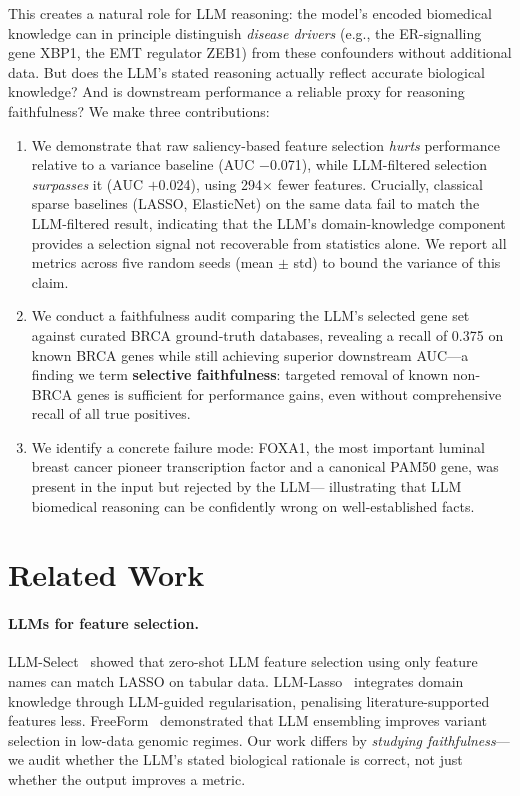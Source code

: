 \documentclass{article}
\begin{document}
This creates a natural role for LLM reasoning: the model's encoded
biomedical knowledge can in principle distinguish \emph{disease drivers}
(e.g., the ER-signalling gene XBP1, the EMT regulator ZEB1) from these
confounders without additional data.
But does the LLM's stated reasoning actually reflect accurate biological
knowledge?
And is downstream performance a reliable proxy for reasoning faithfulness?
We make three contributions:
\begin{enumerate}
  \item We demonstrate that raw saliency-based feature selection
        \emph{hurts} performance relative to a variance baseline
        (AUC $-$0.071), while LLM-filtered selection \emph{surpasses} it
        (AUC $+$0.024), using 294$\times$ fewer features.
        Crucially, classical sparse baselines (LASSO, ElasticNet) on the
        same data fail to match the LLM-filtered result, indicating that
        the LLM's domain-knowledge component provides a selection signal
        not recoverable from statistics alone.
        We report all metrics across five random seeds (mean $\pm$ std)
        to bound the variance of this claim.
  \item We conduct a faithfulness audit comparing the LLM's selected gene
        set against curated BRCA ground-truth databases, revealing a
        recall of 0.375 on known BRCA genes while still achieving
        superior downstream AUC---a finding we term
        \textbf{selective faithfulness}: targeted removal of known
        non-BRCA genes is sufficient for performance gains, even without
        comprehensive recall of all true positives.
  \item We identify a concrete failure mode: FOXA1, the most important
        luminal breast cancer pioneer transcription factor and a canonical
        PAM50 gene, was present in the input but rejected by the LLM---
        illustrating that LLM biomedical reasoning can be confidently
        wrong on well-established facts.
\end{enumerate}

\section{Related Work}
\label{sec:related}

\paragraph{LLMs for feature selection.}
LLM-Select~\citep{jeong2025llmselect} showed that zero-shot LLM feature
selection using only feature names can match LASSO on tabular data.
LLM-Lasso~\citep{zhang2025llmlasso} integrates domain knowledge through
LLM-guided regularisation, penalising literature-supported features less.
FreeForm~\citep{lee2025freeform} demonstrated that LLM ensembling improves
variant selection in low-data genomic regimes.
Our work differs by \emph{studying faithfulness}---we audit whether the
LLM's stated biological rationale is correct, not just whether the output
improves a metric.
\end{document}
